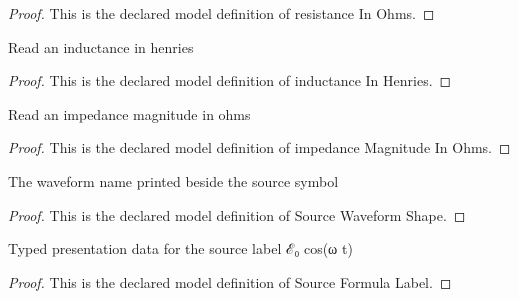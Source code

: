 \begin{proof}
  This is the declared model definition of resistance In Ohms.
\end{proof}
\begin{definition}
  \label{def:physics:phyx-mini-0888:phyxminiproblems-problemphyxmini0888-inductanceinhenries}
  Read an inductance in henries
\end{definition}
\begin{proof}
  This is the declared model definition of inductance In Henries.
\end{proof}
\begin{definition}
  \label{def:physics:phyx-mini-0888:phyxminiproblems-problemphyxmini0888-impedancemagnitudeinohms}
  Read an impedance magnitude in ohms
\end{definition}
\begin{proof}
  This is the declared model definition of impedance Magnitude In Ohms.
\end{proof}
\begin{definition}
  \label{def:physics:phyx-mini-0888:phyxminiproblems-problemphyxmini0888-sourcewaveformshape}
  The waveform name printed beside the source symbol
\end{definition}
\begin{proof}
  This is the declared model definition of Source Waveform Shape.
\end{proof}
\begin{definition}
  \label{def:physics:phyx-mini-0888:phyxminiproblems-problemphyxmini0888-sourceformulalabel}
  Typed presentation data for the source label ℰ₀ cos(ω t)
\end{definition}
\begin{proof}
  This is the declared model definition of Source Formula Label.
\end{proof}

